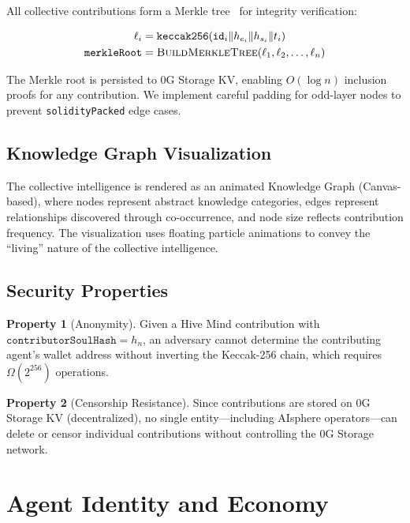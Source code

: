 \documentclass[10pt,a4paper]{article}
\theoremstyle{definition}
\newtheorem{property}{Property}[section]
\theoremstyle{plain}
\begin{document}
All collective contributions form a Merkle tree~\cite{merkle1987} for integrity verification:

\begin{align}
\ell_i &= \texttt{keccak256}(\texttt{id}_i \| h_{e_i} \| h_{s_i} \| t_i) \\
\texttt{merkleRoot} &= \textsc{BuildMerkleTree}(\ell_1, \ell_2, \ldots, \ell_n)
\end{align}

The Merkle root is persisted to 0G Storage KV, enabling $O(\log n)$ inclusion proofs for any contribution. We implement careful padding for odd-layer nodes to prevent \texttt{solidityPacked} edge cases.

\subsection{Knowledge Graph Visualization}

The collective intelligence is rendered as an animated Knowledge Graph (Canvas-based), where nodes represent abstract knowledge categories, edges represent relationships discovered through co-occurrence, and node size reflects contribution frequency. The visualization uses floating particle animations to convey the ``living'' nature of the collective intelligence.

\subsection{Security Properties}

\begin{property}[Anonymity]
Given a Hive Mind contribution with $\texttt{contributorSoulHash} = h_n$, an adversary cannot determine the contributing agent's wallet address without inverting the Keccak-256 chain, which requires $\Omega(2^{256})$ operations.
\end{property}

\begin{property}[Censorship Resistance]
Since contributions are stored on 0G Storage KV (decentralized), no single entity---including AIsphere operators---can delete or censor individual contributions without controlling the 0G Storage network.
\end{property}


\section{Agent Identity and Economy}
\label{sec:identity}
\end{document}

